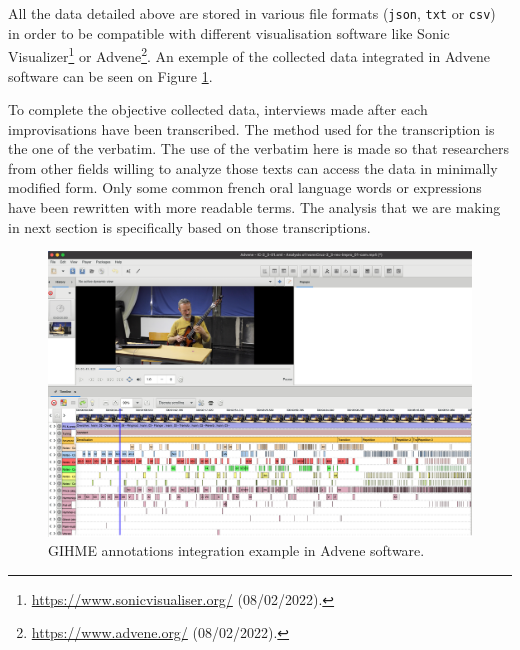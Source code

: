 \documentclass{article}
\begin{document}

All the data detailed above are stored in various file formats (\texttt{json}, \texttt{txt} or \texttt{csv}) in order to be compatible with different visualisation software like Sonic Visualizer\footnote{\url{https://www.sonicvisualiser.org/} (08/02/2022).} or Advene\footnote{\url{https://www.advene.org/} (08/02/2022).}. An exemple of the collected data integrated in Advene software can be seen on Figure \ref{fig:Ivann-2_4-advene}. %

To complete the objective collected data, interviews made after each improvisations have been transcribed.  The me\-thod used for the transcription is the one of the verbatim. The use of the verbatim here is made so that researchers from other fields willing to analyze those texts can access the data in minimally modified form. Only some common french oral language words or expressions have been rewritten with more readable terms. The analysis that we are making in next section is specifically based on those transcriptions. 




\begin{figure}
    \centering
    \includegraphics[width=\columnwidth]{figures/IvannCruz_2_3_1_Advene.png}
    \caption{GIHME annotations integration example in Advene software.}
    \label{fig:Ivann-2_4-advene}
\end{figure}
\end{document}
